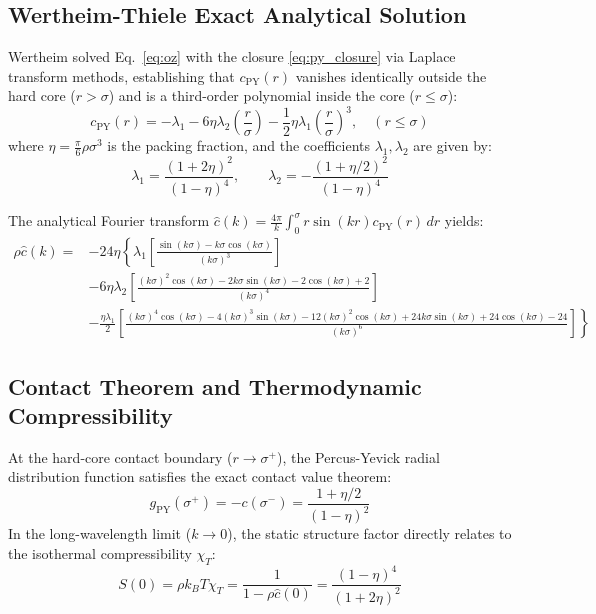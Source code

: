 \documentclass[11pt,a4paper]{article}
\begin{document}
\subsection{Wertheim-Thiele Exact Analytical Solution}

Wertheim \cite{wertheim1963exact} solved Eq.~\eqref{eq:oz} with the closure \eqref{eq:py_closure} via Laplace transform methods, establishing that $c_{\text{PY}}(r)$ vanishes identically outside the hard core ($r > \sigma$) and is a third-order polynomial inside the core ($r \le \sigma$):
\begin{equation}
c_{\text{PY}}(r) = -\lambda_1 - 6\eta \lambda_2 \left(\frac{r}{\sigma}\right) - \frac{1}{2}\eta \lambda_1 \left(\frac{r}{\sigma}\right)^3, \quad (r \le \sigma)
\label{eq:c_py}
\end{equation}
where $\eta = \frac{\pi}{6} \rho \sigma^3$ is the packing fraction, and the coefficients $\lambda_1, \lambda_2$ are given by:
\begin{equation}
\lambda_1 = \frac{(1 + 2\eta)^2}{(1 - \eta)^4}, \qquad \lambda_2 = -\frac{(1 + \eta/2)^2}{(1 - \eta)^4}
\end{equation}

The analytical Fourier transform $\hat{c}(k) = \frac{4\pi}{k} \int_0^\sigma r \sin(kr) c_{\text{PY}}(r) \, dr$ yields:
\begin{align}
\rho \hat{c}(k) = & -24\eta \left\{ \lambda_1 \left[ \frac{\sin(k\sigma) - k\sigma \cos(k\sigma)}{(k\sigma)^3} \right] \right. \nonumber \\
& - 6\eta \lambda_2 \left[ \frac{(k\sigma)^2 \cos(k\sigma) - 2k\sigma \sin(k\sigma) - 2\cos(k\sigma) + 2}{(k\sigma)^4} \right] \nonumber \\
& \left. - \frac{\eta \lambda_1}{2} \left[ \frac{(k\sigma)^4 \cos(k\sigma) - 4(k\sigma)^3 \sin(k\sigma) - 12(k\sigma)^2 \cos(k\sigma) + 24k\sigma \sin(k\sigma) + 24\cos(k\sigma) - 24}{(k\sigma)^6} \right] \right\}
\end{align}

\subsection{Contact Theorem and Thermodynamic Compressibility}

At the hard-core contact boundary ($r \to \sigma^+$), the Percus-Yevick radial distribution function satisfies the exact contact value theorem:
\begin{equation}
g_{\text{PY}}(\sigma^+) = -c(\sigma^-) = \frac{1 + \eta/2}{(1 - \eta)^2}
\label{eq:contact_theo}
\end{equation}
In the long-wavelength limit ($k \to 0$), the static structure factor directly relates to the isothermal compressibility $\chi_T$:
\begin{equation}
S(0) = \rho k_B T \chi_T = \frac{1}{1 - \rho \hat{c}(0)} = \frac{(1 - \eta)^4}{(1 + 2\eta)^2}
\label{eq:s0_theo}
\end{equation}
\end{document}

